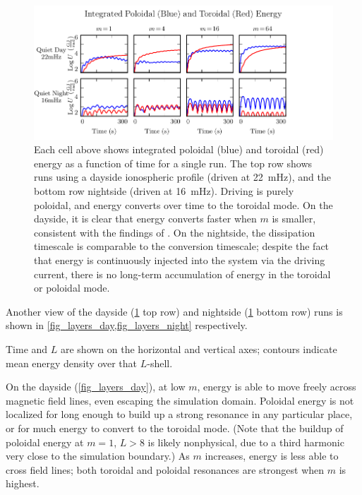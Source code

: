 \documentclass[draft,linenumbers]{agujournal}
\begin{document}
\begin{figure}
    \begin{center}
    \includegraphics[width=\textwidth]{figures/fig_energy.pdf}
    \caption{
        Each cell above shows integrated poloidal (blue) and toroidal (red) energy as a function of time for a single run. The top row shows runs using a dayside ionospheric profile (driven at \SI{22}{\mHz}), and the bottom row nightside (driven at \SI{16}{\mHz}). Driving is purely poloidal, and energy converts over time to the toroidal mode. On the dayside, it is clear that energy converts faster when $m$ is smaller, consistent with the findings of \citet{mann_1995}. On the nightside, the dissipation timescale is comparable to the conversion timescale; despite the fact that energy is continuously injected into the system via the driving current, there is no long-term accumulation of energy in the toroidal or poloidal mode.
    }
    \label{fig_energy}
    \end{center}
\end{figure}

Another view of the dayside (\cref{fig_energy} top row) and nightside (\cref{fig_energy} bottom row) runs is shown in \cref{fig_layers_day,fig_layers_night} respectively.

Time and $L$ are shown on the horizontal and vertical axes; contours indicate mean energy density over that $L$-shell.

On the dayside (\cref{fig_layers_day}), at low $m$, energy is able to move freely across magnetic field lines, even escaping the simulation domain. Poloidal energy is not localized for long enough to build up a strong resonance in any particular place, or for much energy to convert to the toroidal mode. (Note that the buildup of poloidal energy at $m = 1$, $L > 8$ is likely nonphysical, due to a third harmonic very close to the simulation boundary.) As $m$ increases, energy is less able to cross field lines; both toroidal and poloidal resonances are strongest when $m$ is highest.
\end{document}
